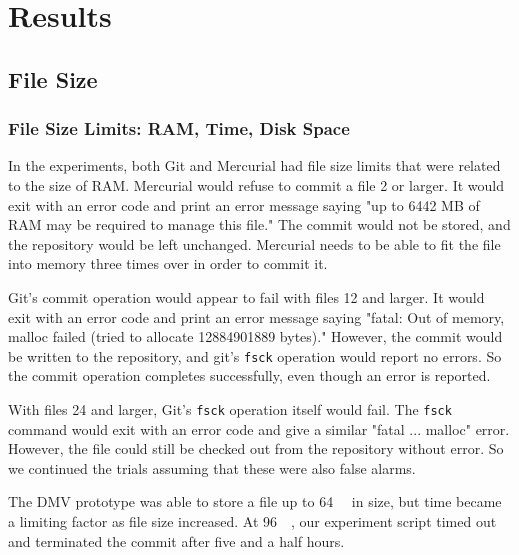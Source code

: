\section{Results}


\subsection{File Size}

\subsubsection{File Size Limits: RAM, Time, Disk Space}


In the experiments, both Git and Mercurial had file size limits that were related to the size of RAM.
Mercurial would refuse to commit a file \SI{2}{\gib} or larger.
It would exit with an error code and print an error message saying "up to 6442 MB of RAM may be required to manage this file."
The commit would not be stored, and the repository would be left unchanged.
Mercurial needs to be able to fit the file into memory three times over in order to commit it.

Git's commit operation would appear to fail with files \SI{12}{\gib} and larger.
It would exit with an error code and print an error message saying "fatal: Out of memory, malloc failed (tried to allocate 12884901889 bytes)."
However, the commit would be written to the repository, and git's \lstinline{fsck} operation would report no errors.
So the commit operation completes successfully, even though an error is reported.

With files \SI{24}{\gib} and larger, Git's \lstinline{fsck} operation itself would fail.
The \lstinline{fsck} command would exit with an error code and give a similar "fatal ... malloc" error.
However, the file could still be checked out from the repository without error.
So we continued the trials assuming that these were also false alarms.

The \gls{DMV} prototype was able to store a file up to \SI{64}{\gibi\byte} in size, but time became a limiting factor as file size increased.
At \SI{96}{\gibi\byte}, our experiment script timed out and terminated the \gls{commit} after five and a half hours.

